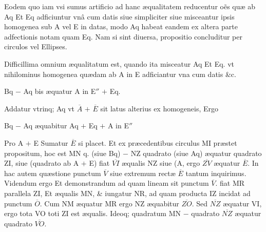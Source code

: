 \documentclass[11pt,a4paper]{article}
\begin{document}
Eodem quo iam vsi sumus artificio ad hanc æqualitatem reducentur oẽs quæ ab Aq Et Eq adficiuntur vnâ cum datis siue simpliciter siue misceantur ipsis homogenea sub A vel E in datas, modo Aq habeat eandem ex altera parte adfectionis notam quam Eq. Nam si sint diuersa, propositio concluditur per circulos vel Ellipses.

Difficillima omnium æqualitatum est, quando ita misceatur Aq Et Eq. vt nihilominus homogenea quædam ab A in E adficiantur vna cum datis \&c.

Bq $-$ Aq bis æquatur A in E$''$ $+$ Eq.

Addatur vtrinq; Aq vt $\overline{A}$ $+$ $\overline{E}$ sit latus alterius ex homogeneis, Ergo


Bq $-$ Aq æquabitur Aq $+$ Eq $+$ A in E$''$


Pro A $+$ E Sumatur $\overline{E}$ si placet. Et ex præcedentibus circulus MI præstet propositum, hoc est MN q. (siue Bq) $-$ NZ quadrato (siue Aq) æquatur quadrato ZI, siue (quadrato ab A $+$ E) fiat $\overline{VI}$ æqualis NZ siue (A, ergo $\overline{ZV}$ æquatur $\overline{E}$. In hac autem quæstione punctum $\overline{V}$ siue extremum rectæ $\overline{E}$ tantum inquirimus. Videndum ergo Et demonstrandum ad quam lineam sit punctum $\overline{V}$. fiat MR parallela ZI, Et æqualis MN, \& iungatur NR, ad quam producta IZ incidat ad punctum $\overline{O}$. Cum NM æquatur MR ergo NZ æquabitur $\overline{ZO}$. Sed $\overline{NZ}$ æquatur VI, ergo tota VO toti ZI est æqualis. Ideoq; quadratum MN $-$ quadrato $\overline{NZ}$ æquatur quadrato $\overline{VO}$.
\end{document}
